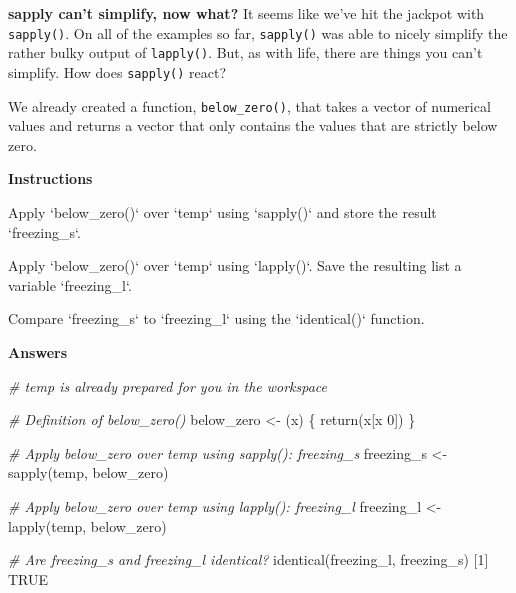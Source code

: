 \documentclass[]{article}
\newcommand{\hlnum}[1]{\textcolor[rgb]{0.816,0.125,0.439}{#1}}%
\newcommand{\hlstr}[1]{\textcolor[rgb]{0.251,0.627,0.251}{#1}}%
\newcommand{\hlcom}[1]{\textcolor[rgb]{0.502,0.502,0.502}{\textit{#1}}}%
\newcommand{\hlstd}[1]{\textcolor[rgb]{0.251,0.251,0.251}{#1}}%
\newcommand{\hlkwc}[1]{\textcolor[rgb]{0.251,0.251,0.251}{#1}}%
\newcommand{\hlkwd}[1]{\textcolor[rgb]{0.878,0.439,0.125}{#1}}%
\newenvironment{Shaded}{\begin{myshaded}}{\end{myshaded}}
\newcommand{\KeywordTok}[1]{\hlkwd{#1}}
\newcommand{\DataTypeTok}[1]{\hlkwc{#1}}
\newcommand{\DecValTok}[1]{\hlnum{#1}}
\newcommand{\StringTok}[1]{\hlstr{#1}}
\newcommand{\CommentTok}[1]{\hlcom{#1}}
\newcommand{\OtherTok}[1]{{#1}}
\newcommand{\NormalTok}[1]{\hlstd{#1}}
\begin{document}
\textbf{sapply can't simplify, now what?} It seems like we've hit the
jackpot with \texttt{sapply()}. On all of the examples so far,
\texttt{sapply()} was able to nicely simplify the rather bulky output of
\texttt{lapply()}. But, as with life, there are things you can't
simplify. How does \texttt{sapply()} react?

We already created a function, \texttt{below\_zero()}, that takes a
vector of numerical values and returns a vector that only contains the
values that are strictly below zero.

\textbf{Instructions}

\begin{Shaded}
\begin{Highlighting}[]
\OperatorTok{*}\StringTok{ }\NormalTok{Apply }\StringTok{`}\DataTypeTok{below_zero()}\StringTok{`}\NormalTok{ over }\StringTok{`}\DataTypeTok{temp}\StringTok{`}\NormalTok{ using }\StringTok{`}\DataTypeTok{sapply()}\StringTok{`}\NormalTok{ and store the result } \StringTok{`}\DataTypeTok{freezing_s}\StringTok{`}\NormalTok{.}

\OperatorTok{*}\StringTok{ }\NormalTok{Apply }\StringTok{`}\DataTypeTok{below_zero()}\StringTok{`}\NormalTok{ over }\StringTok{`}\DataTypeTok{temp}\StringTok{`}\NormalTok{ using }\StringTok{`}\DataTypeTok{lapply()}\StringTok{`}\NormalTok{. Save the resulting list }\NormalTok{ a variable }\StringTok{`}\DataTypeTok{freezing_l}\StringTok{`}\NormalTok{.}

\OperatorTok{*}\StringTok{ }\NormalTok{Compare }\StringTok{`}\DataTypeTok{freezing_s}\StringTok{`}\NormalTok{ to }\StringTok{`}\DataTypeTok{freezing_l}\StringTok{`}\NormalTok{ using the }\StringTok{`}\DataTypeTok{identical()}\StringTok{`}\NormalTok{ function.}
\end{Highlighting}
\end{Shaded}

\textbf{Answers}

\begin{Shaded}
\begin{Highlighting}[]
\CommentTok{# temp is already prepared for you in the workspace}

\CommentTok{# Definition of below_zero()}
\NormalTok{below_zero <-}\StringTok{ }\NormalTok{(x) \{}
  \KeywordTok{return}\NormalTok{(x[x }\OperatorTok{<}\StringTok{ }\DecValTok{0}\NormalTok{])}
\NormalTok{\}}

\CommentTok{# Apply below_zero over temp using sapply(): freezing_s}
\NormalTok{freezing_s <-}\StringTok{ }\KeywordTok{sapply}\NormalTok{(temp, below_zero)}

\CommentTok{# Apply below_zero over temp using lapply(): freezing_l}
\NormalTok{freezing_l <-}\StringTok{ }\KeywordTok{lapply}\NormalTok{(temp, below_zero)}

\CommentTok{# Are freezing_s and freezing_l identical?}
\KeywordTok{identical}\NormalTok{(freezing_l, freezing_s)}
\NormalTok{   [}\DecValTok{1}\NormalTok{] }\OtherTok{TRUE}
\end{Highlighting}
\end{Shaded}
\end{document}
